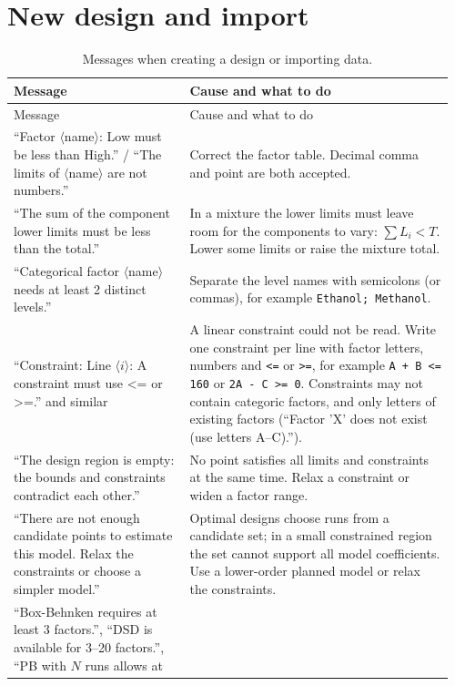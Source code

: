 \section{New design and import}
\label{sec:ch12-design}

{\small\begin{longtable}{@{}p{0.38\linewidth}p{0.58\linewidth}@{}}
\caption{Messages when creating a design or importing data.}\label{tab:ch12-design}\\
\toprule
Message & Cause and what to do \\
\midrule
\endfirsthead
\toprule
Message & Cause and what to do \\
\midrule
\endhead
\bottomrule
\endfoot
``Factor $\langle$name$\rangle$: Low must be less than High.'' / ``The limits of $\langle$name$\rangle$ are not
numbers.'' & Correct the factor table. Decimal comma and point are both accepted. \\
\addlinespace
``The sum of the component lower limits must be less than the total.'' &
In a mixture the lower limits must leave room for the components to vary: $\sum L_i < T$. Lower some limits or
raise the mixture total. \\
\addlinespace
``Categorical factor $\langle$name$\rangle$ needs at least 2 distinct levels.'' &
Separate the level names with semicolons (or commas), for example \texttt{Ethanol; Methanol}. \\
\addlinespace
``Constraint: Line $\langle i\rangle$: A constraint must use <= or >=.'' and similar &
A linear constraint could not be read. Write one constraint per line with factor letters, numbers and \texttt{<=}
or \texttt{>=}, for example \texttt{A + B <= 160} or \texttt{2A - C >= 0}. Constraints may not contain categoric
factors, and only letters of existing factors (``Factor 'X' does not exist (use letters A–C).''). \\
\addlinespace
``The design region is empty: the bounds and constraints contradict each other.'' &
No point satisfies all limits and constraints at the same time. Relax a constraint or widen a factor range. \\
\addlinespace
``There are not enough candidate points to estimate this model. Relax the constraints or choose a simpler model.'' &
Optimal designs choose runs from a candidate set; in a small constrained region the set cannot support all model
coefficients. Use a lower-order planned model or relax the constraints. \\
\addlinespace
``Box-Behnken requires at least 3 factors.'', ``DSD is available for 3–20 factors.'', ``PB with $N$ runs allows at

\end{longtable}}
